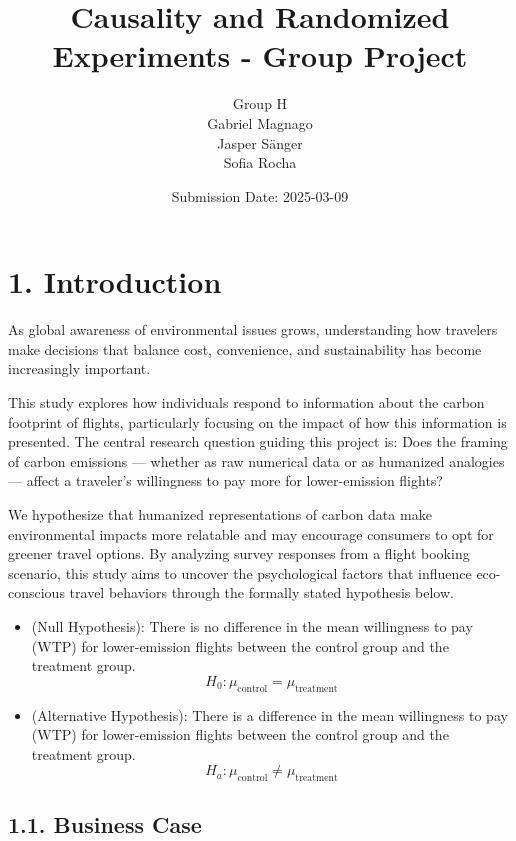 \documentclass[
]{article}
\title{Causality and Randomized Experiments - Group Project}
\author{Group H\\
Gabriel Magnago\\
Jasper Sänger\\
Sofia Rocha}
\date{Submission Date: 2025-03-09}
\providecommand{\tightlist}{%
  \setlength{\itemsep}{0pt}\setlength{\parskip}{0pt}}
\begin{document}
\maketitle

{
\setcounter{tocdepth}{3}
\tableofcontents
}
\newpage

\hypertarget{introduction}{%
\section{1. Introduction}\label{introduction}}

As global awareness of environmental issues grows, understanding how
travelers make decisions that balance cost, convenience, and
sustainability has become increasingly important.

This study explores how individuals respond to information about the
carbon footprint of flights, particularly focusing on the impact of how
this information is presented. The central research question guiding
this project is: Does the framing of carbon emissions --- whether as raw
numerical data or as humanized analogies --- affect a traveler's
willingness to pay more for lower-emission flights?

We hypothesize that humanized representations of carbon data make
environmental impacts more relatable and may encourage consumers to opt
for greener travel options. By analyzing survey responses from a flight
booking scenario, this study aims to uncover the psychological factors
that influence eco-conscious travel behaviors through the formally
stated hypothesis below.

\begin{itemize}
\tightlist
\item
  (Null Hypothesis): There is no difference in the mean willingness to
  pay (WTP) for lower-emission flights between the control group and the
  treatment group. \[
  H_0: \mu_{\text{control}} = \mu_{\text{treatment}}
  \]
\item
  (Alternative Hypothesis): There is a difference in the mean
  willingness to pay (WTP) for lower-emission flights between the
  control group and the treatment group. \[
  H_a: \mu_{\text{control}} \neq \mu_{\text{treatment}}
  \]
\end{itemize}

\hypertarget{business-case}{%
\subsection{1.1. Business Case}\label{business-case}}
\end{document}
